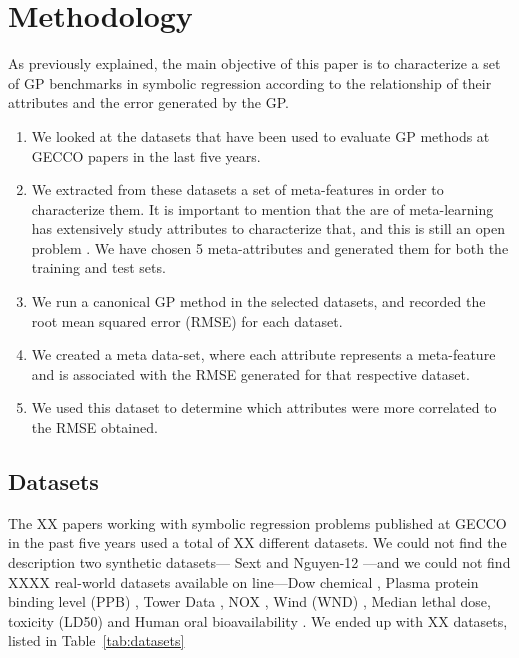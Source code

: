 \section{Methodology}

As previously explained, the main objective of this paper is to characterize a set of GP benchmarks in symbolic regression according to the relationship of their attributes and the error generated by the GP.

\begin{enumerate}
\item We looked at the datasets that have been used to evaluate GP methods at GECCO papers in the last five years.
\item We extracted from these datasets a set of meta-features in order to characterize them. It is important to mention that the are of meta-learning has extensively study attributes to characterize that, and this is still an open problem \cite{}. We have chosen 5 meta-attributes and generated them for both the training and test sets.
\item We run a canonical GP method in the selected datasets, and recorded the root mean squared error (RMSE) for each dataset.
\item We created a meta data-set, where each attribute represents a meta-feature and is associated with the RMSE generated for that respective dataset.
\item We used this dataset to determine which attributes were more correlated to the RMSE obtained.
\end{enumerate}


\subsection{Datasets}

The XX papers working with symbolic regression problems published at GECCO in the past five years used a total of XX different datasets.
We could not find the description two synthetic datasets---
Sext \cite{krawiec2014behavioral} and Nguyen-12 \cite{krawiec2014behavioral,liskowski2017discovery}---and we could not find XXXX real-world datasets available on line---Dow chemical \cite{nicolau2016managing}, Plasma protein binding level (PPB) \cite{castelli2015geometric,oliveira2016dispersion,goncalves2017unsure}, Tower Data \cite{lacava2015genetic,lacava2016epsilon,oliveira2016dispersion}, NOX  \cite{arnaldo2014multiple,arnaldo2015building}, Wind (WND) \cite{lacava2016epsilon}, Median lethal dose, toxicity (LD50) \cite{castelli2015geometric,goncalves2017unsure} and Human oral bioavailability  \cite{castelli2015geometric,dick2015reexamination,oliveira2016dispersion,goncalves2017unsure}.
We ended up with XX datasets, listed in Table~\ref{tab:datasets}


